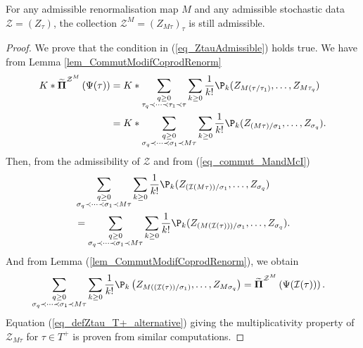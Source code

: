 \documentclass[11pt]{preprint}
\newcommand{\mcB}{\mathcal{B}}
\newcommand{\mcI}{\mathcal{I}}
\newcommand{\mcZ}{\mathcal{Z}}
\def\PPi{\boldsymbol{\Pi}}
\def\eqref#1{(\ref{#1})}
\begin{document}
	
	
	\begin{proposition}
		For any admissible renormalisation map $M$ and any admissible stochastic data $\mcZ=(Z_\tau)$, the collection $\mcZ^M = (Z_{M\tau})_\tau$ is still admissible.
	\end{proposition}	
	
	\begin{proof}
		We prove that the condition in \eqref{eq_ZtauAdmissible} holds true. We have from Lemma \ref{lem_CommutModifCoprodRenorm}
		\begin{align*}
			K * \widetilde{ \PPi}^{\mcZ^M}\left( \Psi(\tau)\right) &=  K * \sum_{\substack{q\geq 0 \\ \tau_q\prec\dots\prec\tau_1\prec\tau}}\sum_{k\geq0} \frac{1}{k!}\P_k( Z_{M(\tau/\tau_1)} ,\dots,Z_{M\tau_q}  )
			\\
			&=K * \sum_{\substack{q\geq 0 \\ \sigma_q\prec\dots\prec\sigma_1\prec M\tau}}\sum_{k\geq0} \frac{1}{k!}\P_k( Z_{(M\tau)/\sigma_1} ,\dots,Z_{\sigma_q}  ).
		\end{align*}
		Then, from the admissibility of $\mcZ$ and from \eqref{eq_commut_MandMcI}
		\begin{align*}
			&\sum_{\substack{q\geq 0 \\ \sigma_q\prec\dots\prec\sigma_1\prec M\tau}}\sum_{k\geq0} \frac{1}{k!}\P_k( Z_{(\mcI (M\tau))/\sigma_1} ,\dots,Z_{\sigma_q}  )
			\\ &
= \sum_{\substack{q\geq 0 \\ \sigma_q\prec\dots\prec\sigma_1\prec M\tau}}\sum_{k\geq0} \frac{1}{k!}\P_k( Z_{(M(\mcI(\tau)))/\sigma_1} ,\dots,Z_{\sigma_q}  ).
		\end{align*}
		And from Lemma \eqref{lem_CommutModifCoprodRenorm}, we obtain
		\begin{align*}
			& \sum_{\substack{q\geq 0 \\ \sigma_q\prec\dots\prec\sigma_1\prec M\tau}}\sum_{k\geq0} \frac{1}{k!}\P_k\left( Z_{M((\mcI(\tau))/\sigma_1)} ,\dots,Z_{M\sigma_q}  \right)
			= \widetilde{ \PPi}^{\mcZ^M}\left( \Psi(\mcI(\tau)) \right).  
		\end{align*}
	Equation \eqref{eq_defZtau_T+_alternative} giving the multiplicativity property of $\mcZ_{M\tau}$ for $\tau\in T^+$ is proven from similar computations.
	\end{proof}
	
	
	
\end{document}
